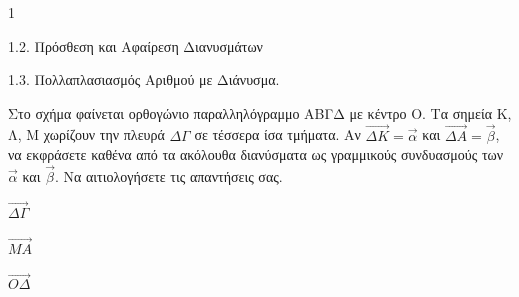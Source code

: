 \begin{ylh}{1}
    \item 1.2. Πρόσθεση και Αφαίρεση Διανυσμάτων
    \item 1.3. Πολλαπλασιασμός Αριθμού με Διάνυσμα.
\end{ylh}
\begin{figure} %
\end{figure}
Στο σχήμα φαίνεται ορθογώνιο παραλληλόγραμμο ΑΒΓΔ με κέντρο Ο. Τα σημεία Κ, Λ, Μ χωρίζουν την πλευρά $\Delta\Gamma$ σε τέσσερα ίσα τμήματα.
Αν $\vec{\Delta K} = \vec{\alpha}$ και $\vec{\Delta A} = \vec{\beta}$, να εκφράσετε καθένα από τα ακόλουθα διανύσματα ως γραμμικούς συνδυασμούς των $\vec{\alpha}$ και $\vec{\beta}$. Να αιτιολογήσετε τις απαντήσεις σας.
\begin{alist}
    \item $\vec{\Delta \Gamma}$ 
    \item $\vec{M A}$ 
    \item $\vec{O \Delta}$ 
\end{alist}